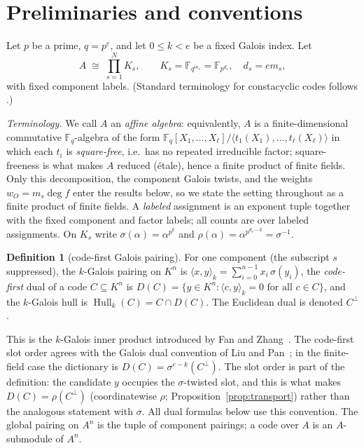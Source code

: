 \documentclass[11pt]{article}
\theoremstyle{definition}
\newtheorem{definition}[theorem]{Definition}
\theoremstyle{remark}
\newcommand{\Fq}{\mathbb{F}_q}
\newcommand{\Hull}{\operatorname{Hull}}
\begin{document}
\section{Preliminaries and conventions}\label{sec:prelim}

Let \(p\) be a prime, \(q = p^e\), and let \(0 \le k < e\) be a fixed
Galois index. Let
\[
A \;\cong\; \prod_{s=1}^{N} K_s, \qquad
K_s = \mathbb{F}_{q^{m_s}} = \mathbb{F}_{p^{d_s}}, \quad d_s = e m_s,
\]
with fixed component labels. (Standard terminology for constacyclic codes
follows \cite{HP2003, MS1977}.)

\emph{Terminology.} We call \(A\) an \emph{affine algebra}: equivalently,
\(A\) is a finite-dimensional commutative \(\Fq\)-algebra of the form
\(\Fq[X_1,\dots,X_\ell]/\langle t_1(X_1),\dots,t_\ell(X_\ell)\rangle\)
in which each \(t_i\) is \emph{square-free}, i.e.\ has no repeated
irreducible factor; square-freeness is what makes \(A\) reduced
(\'etale), hence a finite product of finite fields. Only this
decomposition, the component Galois twists, and the weights
\(w_O = m_s \deg f\) enter the results below, so we state the setting
throughout as a finite product of finite fields. A \emph{labeled}
assignment is an exponent tuple together with the fixed component and
factor labels; all counts are over labeled assignments. On \(K_s\) write
\(\sigma(\alpha) = \alpha^{p^k}\) and
\(\rho(\alpha) = \alpha^{p^{d_s - k}} = \sigma^{-1}\).

\begin{definition}[code-first Galois pairing]
For one component (the subscript \(s\) suppressed), the \(k\)-Galois
pairing on \(K^n\) is
\(\langle x, y \rangle_k = \sum_{i=0}^{n-1} x_i \, \sigma(y_i)\),
the \emph{code-first} dual of a code \(C \subseteq K^n\) is
\(D(C) = \{ y \in K^n : \langle c, y \rangle_k = 0 \text{ for all } c \in C\}\),
and the \(k\)-Galois hull is \(\Hull_k(C) = C \cap D(C)\).
The Euclidean dual is denoted \(C^\perp\).
\end{definition}

This is the \(k\)-Galois inner product introduced by Fan and
Zhang~\cite{FZ2017}. The code-first slot order agrees with the Galois
dual convention of Liu and Pan~\cite{LP2020}; in the finite-field case
the dictionary is \(D(C) = \sigma^{e-k}(C^\perp)\). The slot order is part of the definition: the candidate \(y\) occupies
the \(\sigma\)-twisted slot, and this is what makes
\(D(C) = \rho(C^\perp)\) (coordinatewise \(\rho\);
Proposition~\ref{prop:transport}) rather than the analogous statement
with \(\sigma\). All dual formulas below use this convention. The global
pairing on \(A^n\) is the tuple of component pairings; a code over \(A\)
is an \(A\)-submodule of \(A^n\).
\end{document}
